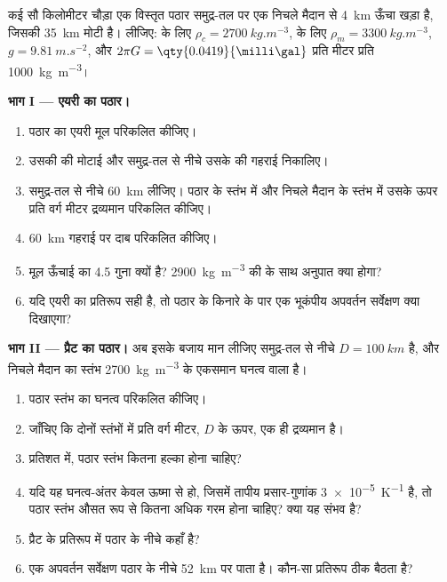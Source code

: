 \begin{problem}
\label{pb:b1:isostasy-gravity:1}
कई सौ किलोमीटर चौड़ा एक विस्तृत पठार समुद्र-तल पर एक निचले मैदान से \qty{4}{km} ऊँचा खड़ा है, जिसकी  \qty{35}{km} मोटी है। लीजिए:  के लिए $\rho_c = \qty{2700}{kg.m^{-3}}$,  के लिए $\rho_m = \qty{3300}{kg.m^{-3}}$, $g = \qty{9.81}{m.s^{-2}}$, और $2\pi G = \qty{0.0419}{\milli\gal}$ प्रति मीटर प्रति \qty{1000}{kg.m^{-3}}।

\medskip
\noindent\textbf{भाग I --- एयरी का पठार।}
\begin{enumerate}
  \item पठार का एयरी मूल परिकलित कीजिए।
  \item उसकी  की मोटाई और समुद्र-तल से नीचे उसके  की गहराई निकालिए।
  \item {} समुद्र-तल से नीचे \qty{60}{km} लीजिए। पठार के स्तंभ में और निचले मैदान के स्तंभ में उसके ऊपर प्रति वर्ग मीटर द्रव्यमान परिकलित कीजिए।
  \item \qty{60}{km} गहराई पर दाब परिकलित कीजिए।
  \item मूल ऊँचाई का 4.5 गुना क्यों है? \qty{2900}{kg.m^{-3}} की  के साथ अनुपात क्या होगा?
  \item यदि एयरी का प्रतिरूप सही है, तो पठार के किनारे के पार एक भूकंपीय अपवर्तन सर्वेक्षण क्या दिखाएगा?
\end{enumerate}

\noindent\textbf{भाग II --- प्रैट का पठार।}
अब इसके बजाय मान लीजिए समुद्र-तल से नीचे  $D = \qty{100}{km}$ है, और निचले मैदान का स्तंभ \qty{2700}{kg.m^{-3}} के एकसमान घनत्व वाला है।
\begin{enumerate}[resume]
  \item पठार स्तंभ का घनत्व परिकलित कीजिए।
  \item जाँचिए कि दोनों स्तंभों में प्रति वर्ग मीटर, $D$ के ऊपर, एक ही द्रव्यमान है।
  \item प्रतिशत में, पठार स्तंभ कितना हल्का होना चाहिए?
  \item यदि यह घनत्व-अंतर केवल ऊष्मा से हो, जिसमें तापीय प्रसार-गुणांक \qty{3e-5}{K^{-1}} है, तो पठार स्तंभ औसत रूप से कितना अधिक गरम होना चाहिए? क्या यह संभव है?
  \item प्रैट के प्रतिरूप में पठार के नीचे  कहाँ है?
  \item एक अपवर्तन सर्वेक्षण पठार के नीचे  \qty{52}{km} पर पाता है। कौन-सा प्रतिरूप ठीक बैठता है?
\end{enumerate}


\end{problem}
